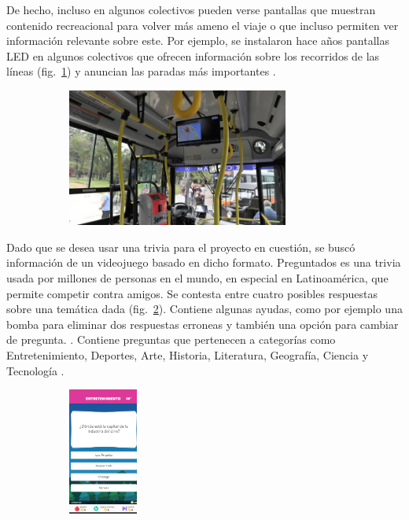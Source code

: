 \documentclass[twoside]{article}
\begin{document}
De hecho, incluso en algunos colectivos pueden verse pantallas que muestran contenido recreacional para volver más ameno el viaje o que incluso permiten ver información relevante sobre este. Por ejemplo, se instalaron hace años pantallas LED en algunos colectivos que ofrecen información sobre los recorridos de las líneas (fig.~\ref{fig:colectivo}) y anuncian las paradas más importantes \parencite{lacapitalColectivos}.
\begin{figure}[H]
	\caption{Colectivo con pantalla que muestra información relevante}
    \begin{subfigure}{1.0\textwidth}
	\includegraphics[width=0.8\textwidth]{colectivo.png}
    \end{subfigure}
	\label{fig:colectivo}
\end{figure}
\vspace{-1.0\baselineskip}
Dado que se desea usar una trivia para el proyecto en cuestión, se buscó información de un videojuego basado en dicho formato. Preguntados es una trivia usada por millones de personas en el mundo, en especial en Latinoamérica, que permite competir contra amigos. Se contesta entre cuatro posibles respuestas sobre una temática dada (fig.~\ref{fig:preguntados}). Contiene algunas ayudas, como por ejemplo una bomba para eliminar dos respuestas erroneas y también una opción para cambiar de pregunta. \parencite{minutouno}. Contiene preguntas que pertenecen a categorías como Entretenimiento, Deportes, Arte, Historia, Literatura, Geografía, Ciencia y Tecnología \parencite{abcPreguntados}.
\begin{figure}[H]
	\caption{Preguntados}
    \begin{subfigure}{1.0\textwidth}
	\includegraphics[width=0.25\textwidth]{preguntados.png}
    \end{subfigure}
	\label{fig:preguntados}
\end{figure}
\end{document}
